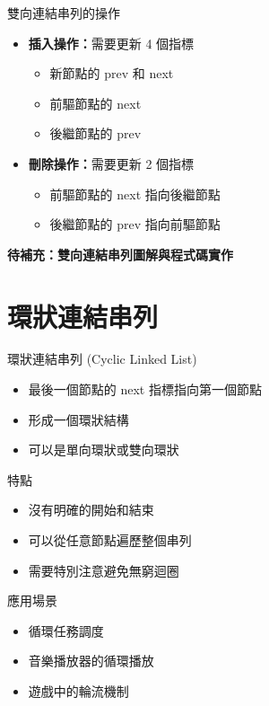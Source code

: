\documentclass{beamer}
\begin{document}
\begin{frame}{雙向連結串列的操作}
\begin{itemize}
    \item \textbf{插入操作：}需要更新 4 個指標
    \begin{itemize}
        \item 新節點的 prev 和 next
        \item 前驅節點的 next
        \item 後繼節點的 prev
    \end{itemize}
    \item \textbf{刪除操作：}需要更新 2 個指標
    \begin{itemize}
        \item 前驅節點的 next 指向後繼節點
        \item 後繼節點的 prev 指向前驅節點
    \end{itemize}
\end{itemize}

\vspace{1em}
\textbf{待補充：雙向連結串列圖解與程式碼實作}
\end{frame}

\section{環狀連結串列}

\begin{frame}{環狀連結串列 (Cyclic Linked List)}
\begin{itemize}
    \item 最後一個節點的 next 指標指向第一個節點
    \item 形成一個環狀結構
    \item 可以是單向環狀或雙向環狀
\end{itemize}

\vspace{1em}
\begin{block}{特點}
\begin{itemize}
    \item 沒有明確的開始和結束
    \item 可以從任意節點遍歷整個串列
    \item 需要特別注意避免無窮迴圈
\end{itemize}
\end{block}

\vspace{1em}
\begin{block}{應用場景}
\begin{itemize}
    \item 循環任務調度
    \item 音樂播放器的循環播放
    \item 遊戲中的輪流機制
\end{itemize}
\end{block}
\end{frame}
\end{document}
